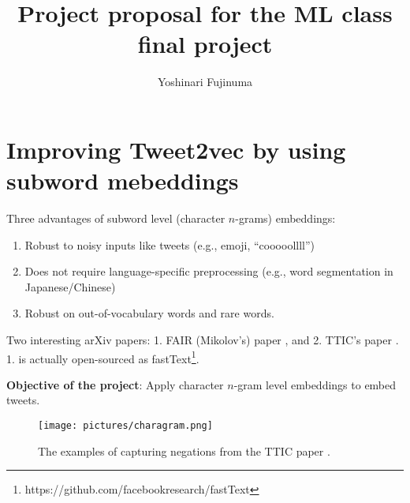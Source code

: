 \documentclass[11pt]{article}
\begin{document}
\vspace{-1cm}
\title{\vspace{-2ex}Project proposal for the ML class final project\vspace{-2ex}}
\author{Yoshinari Fujinuma\vspace{-2ex}}
\date{\vspace{-2ex}}
\maketitle

\vspace{-0.5cm}

\section{Improving Tweet2vec by using subword mebeddings}

Three advantages of subword level (character $n$-grams) embeddings:

\begin{enumerate}
 \setlength\itemsep{0.01em}
 \item Robust to noisy inputs like tweets (e.g., emoji, ``cooooollll'')
 \item Does not require language-specific preprocessing (e.g., word segmentation in Japanese/Chinese)
 \item Robust on out-of-vocabulary words and rare words.
\end{enumerate}

Two interesting arXiv papers: 1. FAIR (Mikolov's) paper \cite{bojanowski2016enriching}, and 2. TTIC's paper \cite{WietingBGL16}. 1. is actually open-sourced as fastText\footnote{https://github.com/facebookresearch/fastText}.

{\bf Objective of the project}: Apply character $n$-gram level embeddings to embed tweets.

\begin{figure}[htb]
  \begin{center}
     \scalebox{0.6}
      {\texttt{[image: pictures/charagram.png]}}

      \caption{The examples of capturing negations from the TTIC paper \cite{WietingBGL16}. }
      \label{fig:learning_rate}
     \end{center}
\vspace{-0.5cm}
\end{figure}





\end{document}
